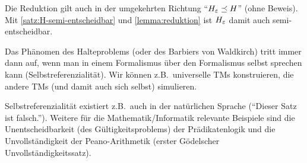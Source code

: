 \begin{Bemerkung}
	Die Reduktion gilt auch in der umgekehrten Richtung "`$H_\varepsilon \preceq H$"' (ohne Beweis).
	Mit \autoref{satz:H-semi-entscheidbar} und \autoref{lemma:reduktion} ist $H_\varepsilon$ damit auch semi-entscheidbar.
\end{Bemerkung}






\def\note#1{{}}

\begin{Bemerkung}
	Das Phänomen des Halteproblems (oder des Barbiers von Waldkirch) tritt immer dann auf, wenn man in einem Formalismus über den Formalismus selbst sprechen kann (Selbstreferenzialität).
	Wir können z.B.\ universelle \ac{TM}s konstruieren, die andere \ac{TM}s (und damit auch sich selbst) simulieren.

	\note{
	Anwendungen in der Informatik:
	\begin{itemize}
		\item Compiler/Interpreter; schreibe Compiler in der gleichen Sprache
		\item Generieren von Programmen
	\end{itemize}
	}

	Selbstreferenzialität existiert z.B.\ auch in der natürlichen Sprache ("`Dieser Satz ist falsch."').
	Weitere für die Mathematik/Informatik relevante Beispiele sind die Unentscheidbarkeit (des Gültigkeitsproblems) der Prädikatenlogik und die Unvollständigkeit der Peano-Arithmetik (erster Gödelscher Unvollständigkeitssatz).
\end{Bemerkung}

\note{
Der Rest der Vorlesung beschäftigt sich hauptsächlich mit Reduktionen.
Reduktionen werden auch ca.\ 25\% der Klausur beanspruchen.
Daher wollen wir uns heute nochmal intensiv damit beschäftigen.
Wie immer gilt: Übung macht den Meister.
}

\note{
Wiederholung: $L$ ist \dots
%
\begin{enumerate}
	\item \dots entscheidbar:
	$\exists \M$: $\M$ akzeptiert $L$ und hält auf allen Eingaben
	\item \dots semi-entscheidbar:
	$\exists \M$: $\M$ akzeptiert $L$
	\item \dots unentscheidbar:
	$L$ ist nicht entscheidbar
\end{enumerate}
}

